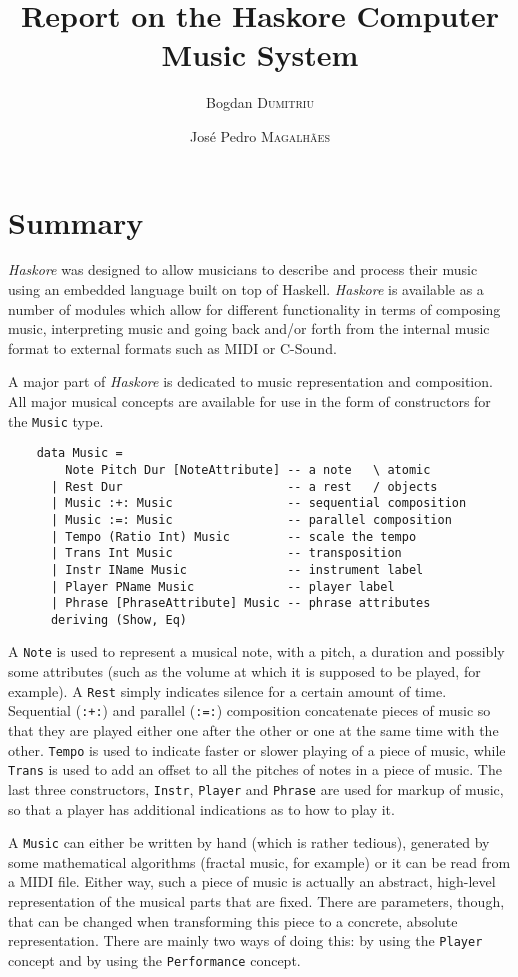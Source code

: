 \documentclass[a4paper,10pt]{article}
\title{Report on the Haskore Computer Music System}
\author{Bogdan \textsc{Dumitriu} \and Jos\'e Pedro \textsc{Magalh\~aes}}
\begin{document}
\maketitle

\section{Summary}
\emph{Haskore} was designed to allow musicians to describe and process
their music using an embedded language built on top of Haskell.
\emph{Haskore} is available as a number of modules which allow for different
functionality in terms of composing music, interpreting music and going back
and/or forth from the internal music format to external formats such as MIDI or
C-Sound.

A major part of \emph{Haskore} is dedicated to music representation and
composition. All major musical concepts are available for use in the form of
constructors for the {\tt Music} type.

\begin{verbatim}
    data Music =
        Note Pitch Dur [NoteAttribute] -- a note   \ atomic
      | Rest Dur                       -- a rest   / objects
      | Music :+: Music                -- sequential composition
      | Music :=: Music                -- parallel composition
      | Tempo (Ratio Int) Music        -- scale the tempo
      | Trans Int Music                -- transposition
      | Instr IName Music              -- instrument label
      | Player PName Music             -- player label
      | Phrase [PhraseAttribute] Music -- phrase attributes
      deriving (Show, Eq)
\end{verbatim}

A {\tt Note} is used to represent a musical note, with a pitch, a duration and
possibly some attributes (such as the volume at which it is supposed to be played,
for example). A {\tt Rest} simply indicates silence for a certain amount of time.
Sequential ({\tt :+:}) and parallel ({\tt :=:}) composition concatenate pieces
of music so that they are played either one after the other or one at the same
time with the other. {\tt Tempo} is used to indicate faster or slower playing of
a piece of music, while {\tt Trans} is used to add an offset to all the pitches of
notes in a piece of music. The last three constructors, {\tt Instr}, {\tt Player}
and {\tt Phrase} are used for markup of music, so that a player has additional
indications as to how to play it.

A {\tt Music} can either be written by hand (which is rather tedious), generated
by some mathematical algorithms (fractal music, for example) or it can be read
from a MIDI file. Either way, such a piece of music is actually an abstract, high-level
representation of the musical parts that are fixed. There are parameters, though,
that can be changed when transforming this piece to a concrete, absolute representation.
There are mainly two ways of doing this: by using the {\tt Player} concept and
by using the {\tt Performance} concept.
\end{document}

